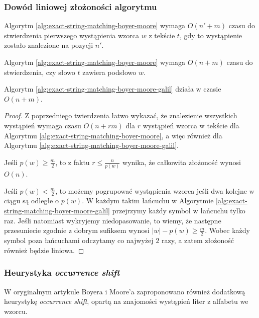 \subsubsection{Dowód liniowej złożoności algorytmu}


\begin{theorem}{}{}
  Algorytm \ref{alg:exact-string-matching-boyer-moore} wymaga $O(n' + m)$ czasu do stwierdzenia pierwszego wystąpienia wzorca $w$ z tekście $t$, gdy to wystąpienie zostało znalezione na pozycji $n'$.
\end{theorem}

\begin{corollary}{}{}
  Algorytm \ref{alg:exact-string-matching-boyer-moore} wymaga $O(n + m)$ czasu do stwierdzenia, czy słowo $t$ zawiera podsłowo $w$.
\end{corollary}

\begin{theorem}{}{}
  Algorytm \ref{alg:exact-string-matching-boyer-moore-galil} działa w czasie $O(n + m)$.
\end{theorem}

\begin{proof}
  Z poprzedniego twierdzenia łatwo wykazać, że znalezienie wszystkich wystąpień wymaga czasu $O(n + r m)$ dla $r$ wystąpień wzorca w tekście dla Algorytmu \ref{alg:exact-string-matching-boyer-moore}, a więc również dla Algorytmu \ref{alg:exact-string-matching-boyer-moore-galil}.
  
  Jeśli $p(w) \ge \frac{m}{2}$, to z faktu $r \le \frac{n}{p(w)}$ wynika, że całkowita złożoność wynosi $O(n)$.
  
  Jeśli $p(w) < \frac{m}{2}$, to możemy pogrupować wystąpienia wzorca jeśli dwa kolejne w ciągu są odległe o $p(w)$. W każdym takim łańcuchu w Algorytmie \ref{alg:exact-string-matching-boyer-moore-galil} przejrzymy każdy symbol w łańcuchu tylko raz.
  Jeśli natomiast wykryjemy niedopasowanie, to wiemy, że następne przesuniecie zgodnie z dobrym sufiksem wynosi $|w| - p(w) \ge \frac{m}{2}$. Wobec każdy symbol poza łańcuchami odczytamy co najwyżej $2$ razy, a zatem złożoność również będzie liniowa.
\end{proof}

\subsubsection{Heurystyka \emph{occurrence shift}}

W oryginalnym artykule Boyera i Moore'a zaproponowano również dodatkową heurystykę \emph{occurrence shift}, opartą na znajomości wystąpień liter z alfabetu we wzorcu.

